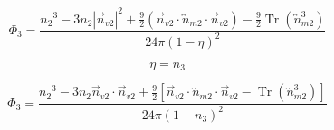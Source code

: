 \documentclass[letterpaper,twocolumn,amsmath,amssymb,prb]{revtex4-1}
\begin{document}
\begin{widetext}
\begin{equation}{\Phi_3=\frac{{n_2}^3-3n_2|\vec{n}_{v2}|^2+\frac{9}{2}(\vec{n}_{v2}\cdot{\overleftrightarrow{n}_{m2}}\cdot{\vec{n}_{v2}})-\frac{9}{2}\operatorname{Tr}({\overleftrightarrow{n}^3_{m2}})}{24\pi(1-\eta)^2}}\end{equation} 

\begin{equation}{\eta=n_3}\end{equation} 

\begin{equation}{\Phi_3=\frac{{n_2}^3-3n_2\vec{n}_{v2}\cdot\vec{n}_{v2}+\frac{9}{2}[\vec{n}_{v2}\cdot{\overleftrightarrow{n}_{m2}}\cdot{\vec{n}_{v2}}-\operatorname{Tr}({\overleftrightarrow{n}^3_{m2}})]}{24\pi(1-n_3)^2}}\end{equation} 
\[{}\]
\[{}\]
\[{}\]
\end{widetext}
\end{document}

